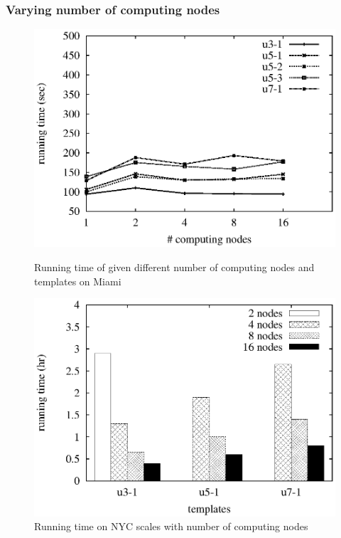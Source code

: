 \subsubsection{Varying number of computing nodes}


\begin{figure}[htbp]
\hfill
\begin{minipage}[t]{0.45\linewidth}
\begin{center}
\centerline{\includegraphics[scale=0.35]{plots/harp-varying-nodes-templates-40-threads-miami.eps}}
\caption{Running time of \harpsahad{} given different number of computing nodes and templates on Miami}
\label{fig:harp-varying-nodes-templates-miami}
\end{center}
\end{minipage}
\hfill
\begin{minipage}[t]{0.45\linewidth}
\begin{center}
\centerline{\includegraphics[scale=0.35]{plots/harp-nyc-varying-nodes.eps}}
\caption{Running time on NYC scales with number of computing nodes}
\label{fig:harp-nyc-varying-nodes}
\end{center}
\end{minipage}
\hfill
\end{figure}


